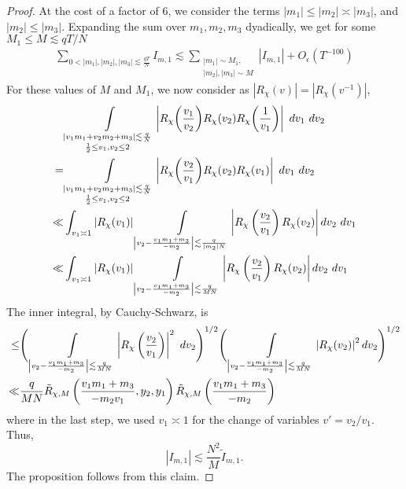 \begin{proof}
    At the cost of a factor of $6$, we consider the terms $|m_1|\leq |m_2|\asymp |m_3|$, and $|m_2|\leq|m_3|$. Expanding the sum over $m_1,m_2,m_3$ dyadically, we get for some $M_1\leq M \lesssim qT/N $ \begin{align*}
        \sum_{0<|m_1|,|m_2|,|m_3|\lesssim \frac{qT}{N}} I_{m,1}\lesssim \sum_{\substack{|m_1|\sim M_1,\\|m_2|,|m_3|\sim M}}|I_{m,1}| + O_\epsilon(T^{-100})
    \end{align*}
    For these values of $M$ and $M_1$, we now consider as $|R_{\chi}(v)|=|R_\chi(v^{-1})|$,
    \begin{align*} 
        &\int\displaylimits_{\substack{
        |v_1m_1+v_2m_2+m_3|\lesssim \frac{q}{N}\\
        \frac{1}{2}\leq v_1,v_2\leq 2
            }}\left|R_{\chi} {\left(\frac{v_1}{v_2}\right)}R_{\chi} {\left(v_2\right)}R_{\chi}{\left(\frac{1}{v_1}\right)}\right| \ dv_1\ dv_2\\
        =&\int\displaylimits_{\substack{
            |v_1m_1+v_2m_2+m_3|\lesssim \frac{q}{N}\\
            \frac{1}{2}\leq v_1,v_2\leq 2
    }}\left|R_{\chi} {\left(\frac{v_2}{v_1}\right)}R_{\chi} {\left(v_2\right)}R_{\chi}{\left({v_1}\right)}\right| \ dv_1\ dv_2\\
        \ll& 
        \int_{v_1\asymp 1}\left|R_{\chi}{\left({v_1}\right)}\right|
        \int\displaylimits_{\left|v_2 - \frac{v_1m_1+m_3}{-m_2}\right|\lesssim \frac{q}{|m_2|N}} \left| R_{\chi}\left(\frac{v_2}{v_1}\right)
        R_{\chi}(v_2)\right|  dv_2 \ dv_1\\
        \ll& 
        \int_{v_1\asymp 1}\left|R_{\chi}{\left({v_1}\right)}\right|
        \int\displaylimits_{\left|v_2 - \frac{v_1m_1+m_3}{-m_2}\right|\lesssim \frac{q}{MN}} \left| R_{\chi}\left(\frac{v_2}{v_1}\right)
        R_{\chi}(v_2)\right|  dv_2 \ dv_1\\
    \end{align*}
    The inner integral, by Cauchy-Schwarz,
    is \begin{align*}
        \leq & \Bigg(\int\displaylimits_{\left|v_2 - \frac{v_1m_1+m_3}{-m_2}\right|\lesssim \frac{q}{MN}} \left| R_{\chi}\left(\frac{v_2}{v_1}\right)\right|^2 \ dv_2 \Bigg)^{1/2}
        \Bigg(
        \int\displaylimits_{\left|v_2 - \frac{v_1m_1+m_3}{-m_2}\right|\lesssim \frac{q}{MN}} \left|
        R_{\chi}(v_2)\right|^2  dv_2\Bigg)^{1/2}\\
        \ll& \frac{q}{MN} \tilde{R}_{\chi,M}\left(\frac{v_1m_1+m_3}{-m_2v_1},y_2,y_1\right)  \tilde{R}_{\chi,M}\left(\frac{v_1m_1+m_3}{-m_2}\right)
    \end{align*}
    where in the last step, we used $v_1\asymp 1$ for the change of variables $v'=v_2/v_1$.
    Thus,
    \[
    |I_{m,1}|\lesssim \frac{N^2}{M}\tilde{I}_{m,1}.
    \]
    The proposition follows from this claim.
    \end{proof}
    
